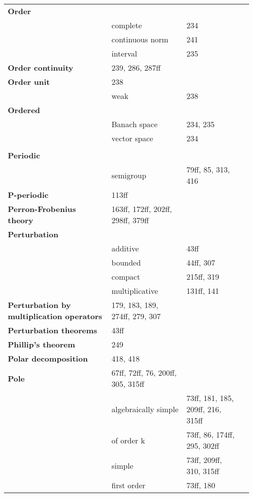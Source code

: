 \documentclass[10pt]{scrartcl}
\begin{document}
\begin{longtable}{>{\bfseries}p{4cm}p{4cm}p{4cm}p{4cm}}
Order 	& \\
	& complete 	& 234 \\
	& continuous norm 	& 241 \\
	& interval 	& 235 \\
Order continuity 	& 239, 286, 287ff \\
Order unit 	& 238 \\
	& weak 	& 238 \\
Ordered 	& \\
	& Banach space 	& 234, 235 \\
	& vector space 	& 234 \\
	& \\
Periodic 	& \\
	& semigroup 	&  79ff, 85, 313, 416 \\
P-periodic 	& 113ff \\
Perron-Frobenius theory 	& 163ff, 172ff, 202ff, 298ff, 379ff \\
Perturbation 	& \\
	& additive 	& 43ff \\
	& bounded 	& 44ff, 307 \\
	& compact 	& 215ff, 319 \\
	& multiplicative 	& 131ff, 141 \\
Perturbation by multiplication operators 	& 179, 183, 189, 274ff, 279, 307 \\
Perturbation theorems 	& 43ff \\
Phillip's theorem 	& 249 \\
Polar decomposition 	& 418, 418 \\
Pole 	& 67ff, 72ff, 76, 200ff, 305, 315ff \\
	& algebraically simple 	& 73ff, 181, 185, 209ff, 216, 315ff \\
	& of order k 	& 73ff, 86, 174ff, 295, 302ff \\
	& simple 	& 73ff, 209ff, 310, 315ff \\
	& first order 	& 73ff, 180 \\

\end{longtable}
\end{document}
